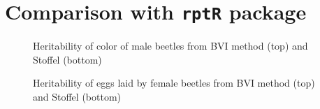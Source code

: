 \section{Comparison with \texttt{rptR} package}



\begin{figure}[!ht]
  \centering
  \caption{Heritability of color of male beetles from BVI method (top) and Stoffel (bottom)}
\end{figure}

\begin{figure}[!ht]
  \centering
  \caption{Heritability of eggs laid by female beetles from BVI method (top) and Stoffel (bottom)}
\end{figure}


